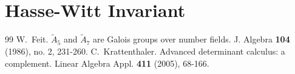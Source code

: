 \documentclass[10pt,a4paper]{amsart}
\begin{document}
\section{Hasse-Witt Invariant} \label{HW_section}


\begin{thebibliography}{99}
 W.~Feit. $\widetilde{A}_{5}$ and $\widetilde{A}_{7}$ are Galois groups over number fields. J. Algebra \textbf{104} (1986), no. 2, 231-260.
 C.~Krattenthaler. Advanced determinant calculus: a complement. Linear Algebra Appl. \textbf{411} (2005), 68-166.
\end{thebibliography}
\end{document}
